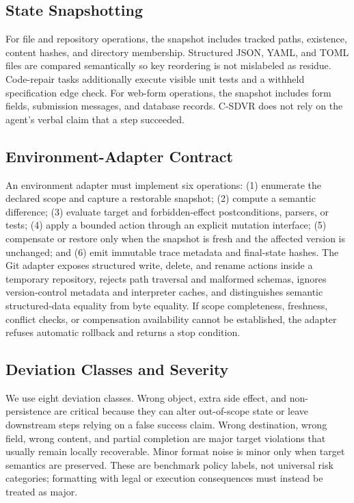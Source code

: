 \documentclass[pdflatex,sn-apa]{sn-jnl}
\begin{document}
\subsection{State Snapshotting}

For file and repository operations, the snapshot includes tracked paths, existence, content hashes, and directory membership. Structured JSON, YAML, and TOML files are compared semantically so key reordering is not mislabeled as residue. Code-repair tasks additionally execute visible unit tests and a withheld specification edge check. For web-form operations, the snapshot includes form fields, submission messages, and database records. C-SDVR does not rely on the agent's verbal claim that a step succeeded.

\subsection{Environment-Adapter Contract}

An environment adapter must implement six operations: (1) enumerate the declared scope and capture a restorable snapshot; (2) compute a semantic difference; (3) evaluate target and forbidden-effect postconditions, parsers, or tests; (4) apply a bounded action through an explicit mutation interface; (5) compensate or restore only when the snapshot is fresh and the affected version is unchanged; and (6) emit immutable trace metadata and final-state hashes. The Git adapter exposes structured write, delete, and rename actions inside a temporary repository, rejects path traversal and malformed schemas, ignores version-control metadata and interpreter caches, and distinguishes semantic structured-data equality from byte equality. If scope completeness, freshness, conflict checks, or compensation availability cannot be established, the adapter refuses automatic rollback and returns a stop condition.

\subsection{Deviation Classes and Severity}

We use eight deviation classes. Wrong object, extra side effect, and non-persistence are critical because they can alter out-of-scope state or leave downstream steps relying on a false success claim. Wrong destination, wrong field, wrong content, and partial completion are major target violations that usually remain locally recoverable. Minor format noise is minor only when target semantics are preserved. These are benchmark policy labels, not universal risk categories; formatting with legal or execution consequences must instead be treated as major.
\end{document}

